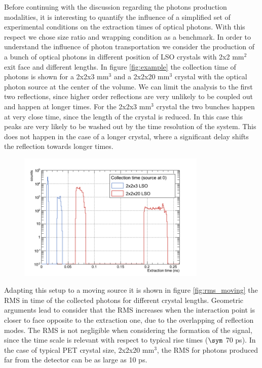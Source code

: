 Before continuing with the discussion regarding the photons production modalities, it is interesting to quantify the influence of a simplified set of experimental conditions on the extraction times of optical photons. With this respect we chose size ratio and wrapping condition as a benchmark.
In order to understand the influence of photon transportation we consider the production of a bunch of optical photons in different position of LSO crystals with 2x2 mm$^{2}$ exit face and different lengths. In figure \ref{fig:example} the collection time of photons is shown for a 2x2x3 mm$^{3}$ and a 2x2x20 mm$^{3}$ crystal with the optical photon source at the center of the volume. We can limit the analysis to the first two reflections, since higher order reflections are very unlikely to be coupled out and happen at longer times. 
For the 2x2x3 mm$^{3}$ crystal the two bunches happen at very close time, since the length of the crystal is reduced. In this case this peaks are very likely to be washed out by the time resolution of the system. This does not happen in the case of a longer crystal, where a significant delay shifts the reflection towards longer times.

\begin{figure}[htbp]
\begin{center}
\includegraphics[width=9cm]{../Pictures/Chapter_6/reflections.png}
\end{center}
\caption[]{}
\label{fig:refl_example}
\end{figure}
Adapting this setup to a moving source it is shown in figure \ref{fig:rms_moving} the RMS in time of the collected photons for different crystal lengths. Geometric arguments lead to consider that the RMS increases when the interaction point is closer to face opposite to the extraction one, due to the overlapping of reflection modes. The RMS is not negligible when considering the formation of the signal, since the time scale is relevant with respect to typical rise times ($\sym$ 70 ps). In the case of typical PET crystal size, 2x2x20 mm$^{3}$, the RMS for photons produced far from the detector can be as large as 10 ps.

